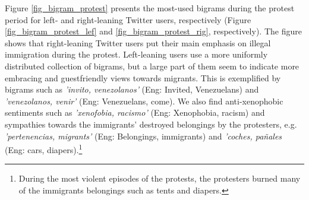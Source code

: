     Figure \ref{fig_bigram_protest} presents the most-used bigrams during the protest period for left- and right-leaning Twitter users, respectively (Figure \ref{fig_bigram_protest_lef} and \ref{fig_bigram_protest_rig}, respectively). The figure shows that right-leaning Twitter users put their main emphasis on illegal immigration during the protest. Left-leaning users use a more uniformly distributed collection of bigrams, but a large part of them seem to indicate more embracing and guestfriendly views towards migrants. This is exemplified by bigrams such as {\it 'invito, venezolanos'} (Eng: Invited, Venezuelans) and {\it 'venezolanos, venir'} (Eng: Venezuelans, come). We also find anti-xenophobic sentiments such as {\it 'xenofobia, racismo'} (Eng: Xenophobia, racism) and sympathies towards the immigrants' destroyed belongings by the protesters, e.g. {\it 'pertenencias, migrants'} (Eng: Belongings, immigrants) and {\it 'coches, pañales} (Eng: cars, diapers).\footnote{During the most violent episodes of the protests, the protesters burned many of the immigrants belongings such as tents and diapers.}
    
